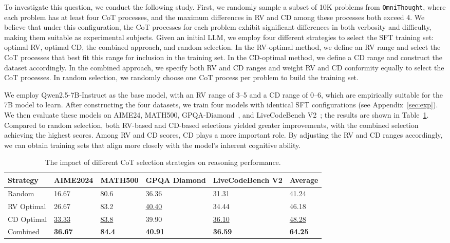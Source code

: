 \documentclass{article}
\begin{document}
To investigate this question, we conduct the following study. First, we randomly sample a subset of 10K problems from \texttt{OmniThought}, where each problem has at least four CoT processes, and the maximum differences in RV and CD among these processes both exceed 4. We believe that under this configuration, the CoT processes for each problem exhibit significant differences in both verbosity and difficulty, making them suitable as experimental subjects. Given an initial LLM, we employ four different strategies to select the SFT training set: optimal RV, optimal CD, the combined approach, and random selection. In the RV-optimal method, we define an RV range and select the CoT processes that best fit this range for inclusion in the training set. In the CD-optimal method, we define a CD range and construct the dataset accordingly. In the combined approach, we specify both RV and CD ranges and weight RV and CD conformity equally to select the CoT processes. In random selection, we randomly choose one CoT process per problem to build the training set.

We employ Qwen2.5-7B-Instruct as the base model, with an RV range of 3–5 and a CD range of 0–6, which are empirically suitable for the 7B model to learn. After constructing the four datasets, we train four models with identical SFT configurations (see Appendix~\ref{sec:exp}). We then evaluate these models on AIME24, MATH500, GPQA-Diamond~\cite{DBLP:journals/corr/abs-2311-12022}, and LiveCodeBench V2~\cite{DBLP:conf/iclr/JainHGLYZWSSS25}; the results are shown in Table~\ref{tab:select}. Compared to random selection, both RV-based and CD-based selections yielded greater improvements, with the combined selection achieving the highest scores. Among RV and CD scores, CD plays a more important role. By adjusting the RV and CD ranges accordingly, we can obtain training sets that align more closely with the model’s inherent cognitive ability.





\begin{table}[t]
\centering
\caption{The impact of different CoT selection strategies on reasoning performance.}
\begin{small}
\begin{tabular}{l|llll|l}
\hline
\bf Strategy & \bf AIME2024 & \bf MATH500 & \bf GPQA Diamond & \bf LiveCodeBench V2 & \bf Average\\
\hline
Random & 16.67 & 80.6 & 36.36 & 31.31 & 41.24\\
\hline
RV Optimal  & 26.67 & 83.2 & \underline{40.40} &  34.44 & 46.18\\
CD Optimal  & \underline{33.33} & \underline{83.8} & 39.90 & \underline{36.10} & \underline{48.28}\\
Combined & \bf 36.67 & \bf 84.4 & \bf 40.91 & \bf 36.59 & \bf 64.25\\
\hline
\end{tabular}
\end{small}
\label{tab:select}
\vspace{-1em}
\end{table}
\end{document}
